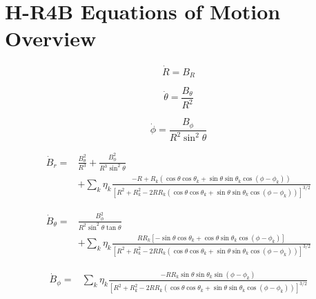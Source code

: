 \chapter{H-R4B Equations of Motion Overview} \label{apx:hr4b-overview}

\begin{equation} \tag{2.67}
    \boxed{
            \dot{R} = B_R
    }
\end{equation}


\begin{equation} \tag{2.72}
    \boxed{
            \dot{\theta} = \frac{B_\theta}{R^2}
    }
\end{equation}


\begin{equation} \tag{2.76}
    \boxed{
            \dot{\phi} = \frac{B_\phi}{R^2 \sin^2{\theta}}
    }
\end{equation}


\begin{equation} \tag{2.86}
    \boxed{
        \!\begin{aligned}
            \dot{B}_r = &\frac{B_\theta^2}{R^3} + \frac{B_\phi^2}{R^3 \sin^2{\theta}} \\
            & + \sum\limits_{k} \eta_k \frac{-R + R_k \left(\cos{\theta}\cos{\theta_k} + \sin{\theta}\sin{\theta_k}\cos{(\phi - \phi_k)}\right)}{\left[R^2 + R_k^2 - 2 R R_k \left(\cos{\theta}\cos{\theta_k} + \sin{\theta}\sin{\theta_k}\cos{(\phi - \phi_k)} \right) \right]^{3/2}}
        \end{aligned}
    }
\end{equation}


\begin{equation} \tag{2.87}
    \boxed{
        \!\begin{aligned}
            \dot{B}_\theta = &\frac{B_\phi^2}{R^2 \sin^2{\theta} \tan{\theta}} \\
            &+ \sum\limits_{k} \eta_k \frac{R R_k \left[-\sin{\theta}\cos{\theta_k} + \cos{\theta}\sin{\theta_k}\cos{(\phi - \phi_k)} \right]}{\left[R^2 + R_k^2 - 2 R R_k \left(\cos{\theta}\cos{\theta_k} + \sin{\theta}\sin{\theta_k}\cos{(\phi - \phi_k)} \right) \right]^{3/2}}
        \end{aligned}
    }
\end{equation}


\begin{equation} \tag{2.88}
    \boxed{
        \!\begin{aligned}
            \dot{B}_\phi = &\sum\limits_{k} \eta_k \frac{- R R_k \sin{\theta}\sin{\theta_k}\sin{(\phi - \phi_k)}}{\left[R^2 + R_k^2 - 2 R R_k \left(\cos{\theta}\cos{\theta_k} + \sin{\theta}\sin{\theta_k}\cos{(\phi - \phi_k)} \right) \right]^{3/2}}
        \end{aligned}
    }
\end{equation}
